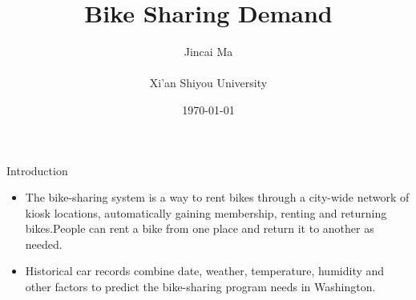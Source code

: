 \documentclass[
 size=14pt,
 paper=smartboard,  %
 mode=present, 		%
 display=slides, 	%
 style=tuliplab,  	%
 pauseslide,
 fleqn,leqno]{powerdot}
\title{Bike Sharing Demand}
\author{
   Jincai Ma
\\
\\Xi'an Shiyou University}
\date{\today}
\begin{document}
\maketitle







\begin{slide}{Introduction}
\begin{center}

{
\begin{itemize}
\item 
The bike-sharing system is a way to rent bikes through a city-wide network of kiosk locations, automatically gaining membership, renting and returning bikes.People can rent a bike from one place and return it to another as needed.
\item Historical car records combine date, weather, temperature, humidity and other factors to predict the bike-sharing program needs in Washington.

\end{itemize}
}

\end{center}
\bigskip
\begin{center}

\end{center}
\bigskip



\end{slide}
\end{document}
